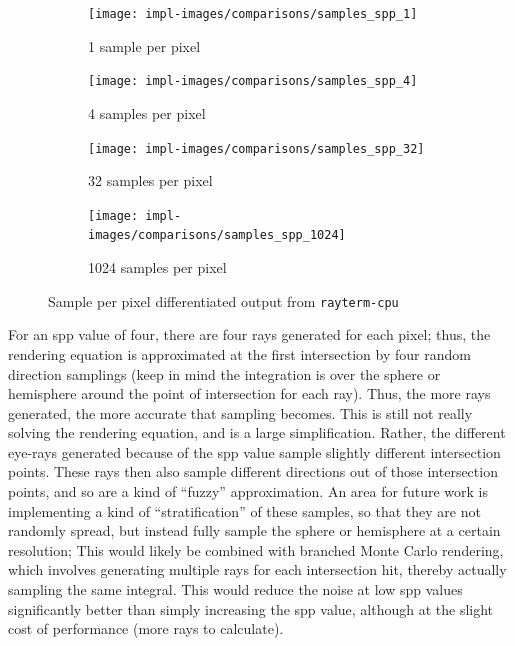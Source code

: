 \vspace{0.3em}
\begin{figure}[htb]
  \centering
  \begin{subfigure}[htb]{0.45\textwidth}
    \texttt{[image: impl-images/comparisons/samples\_spp\_1]}
    \caption{1 sample per pixel}
    \label{fig:rayterm-cpu_ppm_noisy_1}
  \end{subfigure}
  \hspace{1em}
  \begin{subfigure}[htb]{0.45\textwidth}
    \texttt{[image: impl-images/comparisons/samples\_spp\_4]}
    \caption{4 samples per pixel}
    \label{fig:rayterm-cpu_ppm_noisy_4}
  \end{subfigure}
  \vspace{1em}
  \begin{subfigure}[htb]{0.45\textwidth}
    \texttt{[image: impl-images/comparisons/samples\_spp\_32]}
    \caption{32 samples per pixel}
    \label{fig:rayterm-cpu_ppm_noisy_32}
  \end{subfigure}
  \hspace{1em}
  \begin{subfigure}[htb]{0.45\textwidth}
    \texttt{[image: impl-images/comparisons/samples\_spp\_1024]}
    \caption{1024 samples per pixel}
    \label{fig:rayterm-cpu_ppm_noisy_1024}
  \end{subfigure}
  \caption{Sample per pixel differentiated output from \texttt{rayterm-cpu}}
  \label{fig:rayterm-cpu_ppm_noisy}
\end{figure}

For an spp value of four, there are four rays generated for each pixel; thus, the rendering equation \cite{kajiya1986rendering} is approximated at the first intersection by four random direction samplings (keep in mind the integration is over the sphere or hemisphere around the point of intersection for each ray).
Thus, the more rays generated, the more accurate that sampling becomes.
This is still not really solving the rendering equation, and is a large simplification.
Rather, the different eye-rays generated because of the spp value sample slightly different intersection points.
These rays then also sample different directions out of those intersection points, and so are a kind of ``fuzzy'' approximation.
An area for future work is implementing a kind of ``stratification'' of these samples, so that they are not randomly spread, but instead fully sample the sphere or hemisphere at a certain resolution;
This would likely be combined with branched Monte Carlo rendering, which involves generating multiple rays for each intersection hit, thereby actually sampling the same integral.
This would reduce the noise at low spp values significantly better than simply increasing the spp value, although at the slight cost of performance (more rays to calculate).

